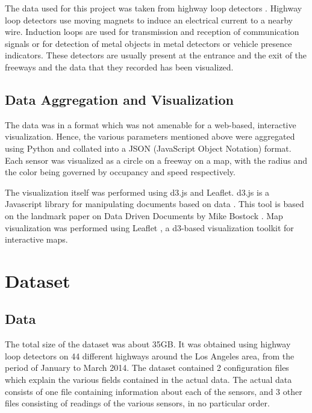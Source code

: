 \documentclass{llncs}
\begin{document}
The data used for this project was taken from highway loop detectors \cite{inductionloopwiki}. Highway loop detectors use moving magnets to induce an electrical current to a nearby wire. Induction loops are used for transmission and reception of communication signals or for detection of metal objects in metal detectors or vehicle presence indicators. These detectors are usually present at the entrance and the exit of the freeways and the data that they recorded has been visualized.

\subsection{Data Aggregation and Visualization}\label{sec:Data Aggregation and Visualization}

The data was in a format which was not amenable for a web-based, interactive visualization. Hence, the various parameters mentioned above were aggregated using Python and collated into a JSON (JavaScript Object Notation) format. Each sensor was visualized as a circle on a freeway on a map, with the radius and the color being governed by occupancy and speed respectively.

The visualization itself was performed using d3.js and Leaflet. d3.js is a Javascript library for manipulating documents based on data \cite{d3website} \cite{Murray2013}. This tool is based on the landmark paper on Data Driven Documents by Mike Bostock \cite{MichaelBostock2011}. Map visualization was performed using Leaflet \cite{leafletwebsite}, a d3-based visualization toolkit for interactive maps.

\section{Dataset}\label{sec:Dataset}

\subsection{Data}\label{sec:Data}

The total size of the dataset was about 35GB. It was obtained using highway loop detectors on 44 different highways around the Los Angeles area, from the period of January to March 2014. The dataset contained 2 configuration files which explain the various fields contained in the actual data. The actual data consists of one file containing information about each of the sensors, and 3 other files consisting of readings of the various sensors, in no particular order.
\end{document}
